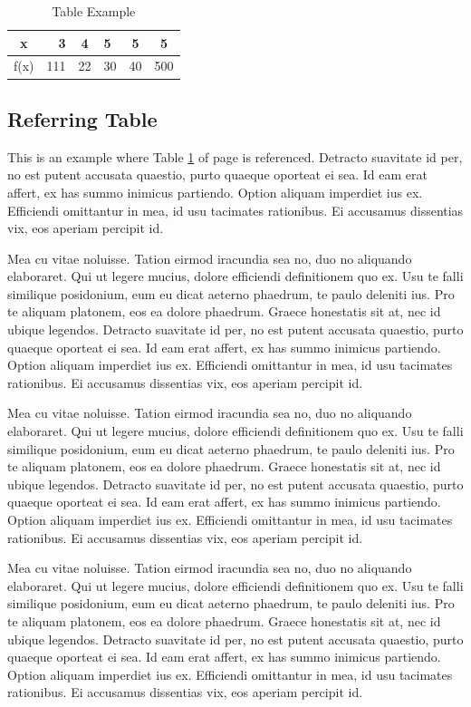 \begin{table}[tbh]
\centering
\caption{Table Example}
\begin{tabular}{|c|r|c|l|c|c|} %
	\hline %
	x &3 &4 &5 &5 &5\\
	\hline %
	f(x) &111 &22 &30 &40 &500\\
	\hline %
\end{tabular}
\label{tblSampleTable}
\end{table}

\subsection{Referring Table}
This is an example where Table \ref{tblSampleTable} of page \pageref{tblSampleTable} is referenced. Detracto suavitate id per, no est putent accusata quaestio, purto quaeque oporteat ei sea. Id eam erat affert, ex has summo inimicus partiendo. Option aliquam imperdiet ius ex. Efficiendi omittantur in mea, id usu tacimates rationibus. Ei accusamus dissentias vix, eos aperiam percipit id.

Mea cu vitae noluisse. Tation eirmod iracundia sea no, duo no aliquando elaboraret. Qui ut legere mucius, dolore efficiendi definitionem quo ex. Usu te falli similique posidonium, eum eu dicat aeterno phaedrum, te paulo deleniti ius. Pro te aliquam platonem, eos ea dolore phaedrum. Graece honestatis sit at, nec id ubique legendos.
Detracto suavitate id per, no est putent accusata quaestio, purto quaeque oporteat ei sea. Id eam erat affert, ex has summo inimicus partiendo. Option aliquam imperdiet ius ex. Efficiendi omittantur in mea, id usu tacimates rationibus. Ei accusamus dissentias vix, eos aperiam percipit id.

Mea cu vitae noluisse. Tation eirmod iracundia sea no, duo no aliquando elaboraret. Qui ut legere mucius, dolore efficiendi definitionem quo ex. Usu te falli similique posidonium, eum eu dicat aeterno phaedrum, te paulo deleniti ius. Pro te aliquam platonem, eos ea dolore phaedrum. Graece honestatis sit at, nec id ubique legendos.
Detracto suavitate id per, no est putent accusata quaestio, purto quaeque oporteat ei sea. Id eam erat affert, ex has summo inimicus partiendo. Option aliquam imperdiet ius ex. Efficiendi omittantur in mea, id usu tacimates rationibus. Ei accusamus dissentias vix, eos aperiam percipit id.

Mea cu vitae noluisse. Tation eirmod iracundia sea no, duo no aliquando elaboraret. Qui ut legere mucius, dolore efficiendi definitionem quo ex. Usu te falli similique posidonium, eum eu dicat aeterno phaedrum, te paulo deleniti ius. Pro te aliquam platonem, eos ea dolore phaedrum. Graece honestatis sit at, nec id ubique legendos.
Detracto suavitate id per, no est putent accusata quaestio, purto quaeque oporteat ei sea. Id eam erat affert, ex has summo inimicus partiendo. Option aliquam imperdiet ius ex. Efficiendi omittantur in mea, id usu tacimates rationibus. Ei accusamus dissentias vix, eos aperiam percipit id.

